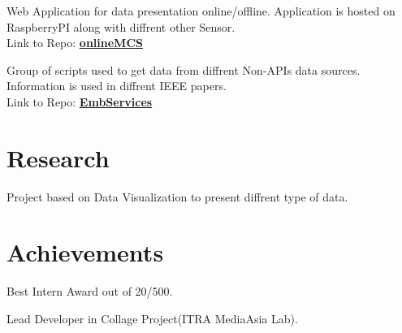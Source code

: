 \documentclass[]{deedy-resume-openfont}
\begin{document}
\begin{minipage}[t]{0.66\textwidth}
Web Application for data presentation online/offline. Application is hosted on RaspberryPI along with diffrent other Sensor. \\
Link to Repo: \textbf{\href{https://github.com/ItsForkIT/onlinemcs}{onlineMCS}}
\sectionsep

Group of scripts used to get data from diffrent Non-APIs data sources. Information is used in diffrent IEEE papers. \\
Link to Repo: \textbf{\href{https://github.com/Apex1000/udash}{ EmbServices}}
\sectionsep



\section{Research}
Project based on Data Visualization to present diffrent type of data.
\sectionsep



\section{Achievements}
\sectionsep 
\begin{tightemize}
\item Best Intern Award out of 20/500.
\item Lead Developer in Collage Project(ITRA MediaAsia Lab).

\end{tightemize}
\sectionsep


\end{minipage} 
\end{document}
